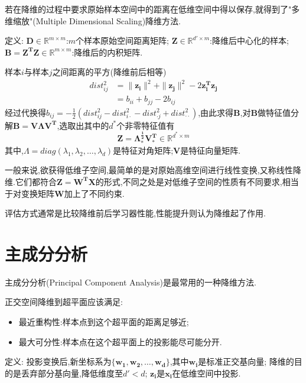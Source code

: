 若在降维的过程中要求原始样本空间中的距离在低维空间中得以保存,就得到了"多维缩放"(Multiple Dimensional Scaling)降维方法.

定义:  
$\mathbf{D}\in\mathbb{R}^{m\times m}$:$m$个样本原始空间距离矩阵;  
$\mathbf{Z}\in\mathbb{R}^{d'\times m}$:降维后中心化的样本;  
$\mathbf{B}=\mathbf{Z^TZ}\in\mathbb{R}^{m\times m}$:降维后的内积矩阵.

样本$i$与样本$j$之间距离的平方(降维前后相等)
\begin{equation}\begin{split}
dist_{ij}^2&=\|\mathbf{z_i}\|^2+\|\mathbf{z_j}\|^2-2\mathbf{z_i^Tz_j}\\
&=b_{ii}+b_{jj}-2b_{ij}
\end{split}\end{equation}
经过代换得$b_{ij}=-\frac{1}{2}(dist_{ij}^2-dist_{i\cdot}^2-dist_{\cdot j}^2+dist_{\cdot\cdot}^2)$,由此求得$\mathbf{B}$,对$\mathbf{B}$做特征值分解$\mathbf{B=V\Lambda V^T}$,选取出其中的$d^\ast$个非零特征值有
\begin{equation}
\mathbf{Z=\Lambda_{\ast}^{\frac{1}{2}}V_{\ast}^T}\in\mathbb{R}^{d^\ast\times m}
\end{equation}
其中,$\Lambda=diag(\lambda_1, \lambda_2, \dots, \lambda_d)$是特征对角矩阵;$\mathbf{V}$是特征向量矩阵.

一般来说,欲获得低维子空间,最简单的是对原始高维空间进行线性变换,又称线性降维.它们都符合$\mathbf{Z=W^TX}$的形式,不同之处是对低维子空间的性质有不同要求,相当于对变换矩阵$\mathbf{W}$加上了不同约束.

评估方式通常是比较降维前后学习器性能,性能提升则认为降维起了作用.

\section{主成分分析}

主成分分析(Principal Component Analysis)是最常用的一种降维方法.

正交空间降维到超平面应该满足:
\begin{itemize}
\item 最近重构性:样本点到这个超平面的距离足够近;
\item 最大可分性:样本点在这个超平面上的投影能尽可能分开.
\end{itemize}

定义:  
投影变换后,新坐标系为$\{\mathbf{w_1, w_2, \dots, w_d}\}$,其中$\mathbf{w_i}$是标准正交基向量;  
降维的目的是丢弃部分基向量,降低维度至$d'< d$;  
$\mathbf{z_i}$是$\mathbf{x_i}$在低维空间中投影.

